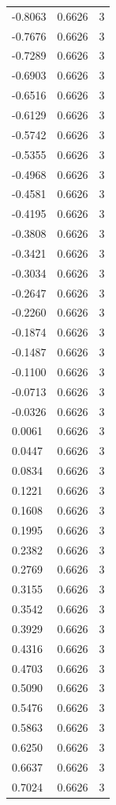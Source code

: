 \begin{longtable}{lrr}
  -0.8063 & 0.6626 & 3 \\
  -0.7676 & 0.6626 & 3 \\
  -0.7289 & 0.6626 & 3 \\
  -0.6903 & 0.6626 & 3 \\
  -0.6516 & 0.6626 & 3 \\
  -0.6129 & 0.6626 & 3 \\
  -0.5742 & 0.6626 & 3 \\
  -0.5355 & 0.6626 & 3 \\
  -0.4968 & 0.6626 & 3 \\
  -0.4581 & 0.6626 & 3 \\
  -0.4195 & 0.6626 & 3 \\
  -0.3808 & 0.6626 & 3 \\
  -0.3421 & 0.6626 & 3 \\
  -0.3034 & 0.6626 & 3 \\
  -0.2647 & 0.6626 & 3 \\
  -0.2260 & 0.6626 & 3 \\
  -0.1874 & 0.6626 & 3 \\
  -0.1487 & 0.6626 & 3 \\
  -0.1100 & 0.6626 & 3 \\
  -0.0713 & 0.6626 & 3 \\
  -0.0326 & 0.6626 & 3 \\
  0.0061 & 0.6626 & 3 \\
  0.0447 & 0.6626 & 3 \\
  0.0834 & 0.6626 & 3 \\
  0.1221 & 0.6626 & 3 \\
  0.1608 & 0.6626 & 3 \\
  0.1995 & 0.6626 & 3 \\
  0.2382 & 0.6626 & 3 \\
  0.2769 & 0.6626 & 3 \\
  0.3155 & 0.6626 & 3 \\
  0.3542 & 0.6626 & 3 \\
  0.3929 & 0.6626 & 3 \\
  0.4316 & 0.6626 & 3 \\
  0.4703 & 0.6626 & 3 \\
  0.5090 & 0.6626 & 3 \\
  0.5476 & 0.6626 & 3 \\
  0.5863 & 0.6626 & 3 \\
  0.6250 & 0.6626 & 3 \\
  0.6637 & 0.6626 & 3 \\
  0.7024 & 0.6626 & 3 \\

\end{longtable}
